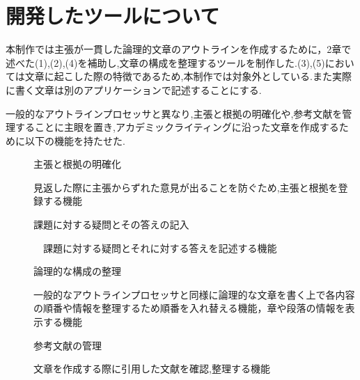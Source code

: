 \documentclass[twocolumn,10pt,a4j]{jsarticle}
\begin{document}
\section{開発したツールについて}
本制作では主張が一貫した論理的文章のアウトラインを作成するために，2章で述べた(1),(2),(4)を補助し,文章の構成を整理するツールを制作した.(3),(5)においては文章に起こした際の特徴であるため,本制作では対象外としている.また実際に書く文章は別のアプリケーションで記述することにする.

一般的なアウトラインプロセッサと異なり,主張と根拠の明確化や,参考文献を管理することに主眼を置き,アカデミックライティングに沿った文章を作成するために以下の機能を持たせた.

\begin{description}
  \item[]主張と根拠の明確化
  
  見返した際に主張からずれた意見が出ることを防ぐため,主張と根拠を登録する機能
  
  \item[]課題に対する疑問とその答えの記入
  
　課題に対する疑問とそれに対する答えを記述する機能
  
  \item[]論理的な構成の整理
  
  一般的なアウトラインプロセッサと同様に論理的な文章を書く上で各内容の順番や情報を整理するため順番を入れ替える機能，章や段落の情報を表示する機能
  
  \item[]参考文献の管理
  
  文章を作成する際に引用した文献を確認,整理する機能 
\end{description}

\begin{comment}
実装した機能として\textcircled{\scriptsize{1}}は「主張と根拠の対応」,\textcircled{\scriptsize{2}}は「課題に対する疑問とその答えの記入」,\textcircled{\scriptsize{3}}は「論理的な構成の整理」,\textcircled{\scriptsize{4}}「参考文献の管理」とする．
\textcircled{\scriptsize{1}}「主張と根拠」ではまず主張の表示をした.
また根拠は複数存在する可能性があるため根拠の追加も行えるようにした.
\textcircled{\scriptsize{2}}「問いと答え」では課題や主張への疑問とそれに対する答えを短い文章で記述し，見返した際に主張からずれた意見が出ることを防ぐことができると考え，課題や主張への疑問と答えを短い文章で記述する．
\textcircled{\scriptsize{3}}「論理的な構成」では論理的な文章を書く上で各内容の順番や序論，本論，結論のどの部分の情報なのかを整理するため順番を入れ替える機能，文章がどの章に情報なのか表示する機能にした．
\textcircled{\scriptsize{4}}「参考文献」では文章を作成する際の引用した文献を整理することが目的であり,どの文献が何章で参照を行ったのか確認できるように参考文献にはラベルを付けた.
\end{comment}
\end{document}
